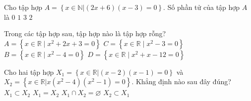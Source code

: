 \begin{ex}%
Cho tập hợp $A=\left\{ \left. x\in \mathbb{N} \right|\left( 2x+6 \right)\left( x-3 \right)=0 \right\}$. Số phần tử của tập hợp $A$ là
\choice
{ $0$}
{\True $1$}
{ $3$}
{ $2$}
\loigiai{
Ta có $\left( 2x+6 \right)\left( x-3 \right)=0\Leftrightarrow \left[ \begin{aligned}
& 2x+6=0 \\
& x-3=0 \\
\end{aligned} \right.\Leftrightarrow \left[ \begin{aligned}
& x=-3\notin \mathbb{N} \\
& x=3\in \mathbb{N}. \\
\end{aligned} \right.$\\
Vậy $A=\left\{ 3 \right\}$ nên tập $A$ có 1 phần tử.}
\end{ex}

\begin{ex}%
Trong các tập hợp sau, tập hợp nào là tập hợp rỗng?
\choice
{\True $A= \left\{ x \in \mathbb{R} \mid x^2+2x+3=0 \right\}$}
{$C= \left\{ x \in \mathbb{R} \mid x^2-3=0 \right\}$}
{$B= \left\{ x \in \mathbb{R} \mid x^2-4=0 \right\}$}
{$D= \left\{ x \in \mathbb{R} \mid x^2+x-12=0 \right\}$}
\end{ex}

\begin{ex}%
Cho hai tập hợp $ X_1=\left\lbrace x \in \mathbb{R}|(x-2)(x-1)=0\right\rbrace  $ và $ X_2=\left\lbrace x \in \mathbb{R}|x(x^2-4)(x^2-1)=0\right\rbrace  $. Khẳng định nào sau đây đúng?
\choice
{\True $ X_1 \subset X_2 $}
{$ X_1 =X_2$}
{$ X_1 \cap X_2=\varnothing $}
{$ X_2 \subset X_1$}
\end{ex}

